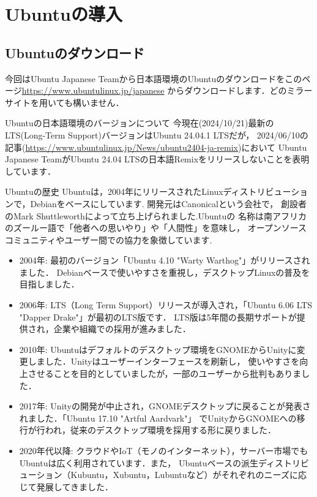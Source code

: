 \documentclass[dvipdfmx,a4paper,11pt]{jsbook}
\begin{document}
\chapter{Ubuntuの導入}
\section{Ubuntuのダウンロード}
今回はUbuntu Japanese Teamから日本語環境のUbuntuのダウンロードをこのページ\url{https://www.ubuntulinux.jp/japanese}
からダウンロードします．どのミラーサイトを用いても構いません．
\begin{mainbox}{Ubuntuの日本語環境のバージョンについて}
  今現在(2024/10/21)最新のLTS(Long-Term Support)バージョンはUbuntu 24.04.1 LTSだが，
  2024/06/10の記事(\url{https://www.ubuntulinux.jp/News/ubuntu2404-ja-remix})において
  Ubuntu Japanese TeamがUbuntu 24.04 LTSの日本語Remixをリリースしないことを表明しています．
\end{mainbox}

\begin{subbox}{Ubuntuの歴史}
  Ubuntuは，2004年にリリースされたLinuxディストリビューションで，Debianをベースにしています.
  開発元はCanonicalという会社で，
  創設者のMark Shuttleworthによって立ち上げられました.Ubuntuの
  名称は南アフリカのズールー語で「他者への思いやり」や「人間性」を意味し，
  オープンソースコミュニティやユーザー間での協力を象徴しています.
  \begin{itemize}
    \item 2004年: 最初のバージョン「Ubuntu 4.10 "Warty Warthog"」がリリースされました．
    Debianベースで使いやすさを重視し，デスクトップLinuxの普及を目指しました．
    \item 2006年: LTS（Long Term Support）リリースが導入され，「Ubuntu 6.06 LTS "Dapper Drake"」が最初のLTS版です．
    LTS版は5年間の長期サポートが提供され，企業や組織での採用が進みました．
    \item 2010年: Ubuntuはデフォルトのデスクトップ環境をGNOMEからUnityに変更しました．Unityはユーザーインターフェースを刷新し，
    使いやすさを向上させることを目的としていましたが，一部のユーザーから批判もありました．
    \item 2017年: Unityの開発が中止され，GNOMEデスクトップに戻ることが発表されました．「Ubuntu 17.10 "Artful Aardvark"」
    でUnityからGNOMEへの移行が行われ，従来のデスクトップ環境を採用する形に戻りました．
    \item 2020年代以降: クラウドやIoT（モノのインターネット），サーバー市場でもUbuntuは広く利用されています．また，
    Ubuntuベースの派生ディストリビューション（Kubuntu，Xubuntu，Lubuntuなど）がそれぞれのニーズに応じて発展してきました．
  \end{itemize}
\end{subbox}
\end{document}
